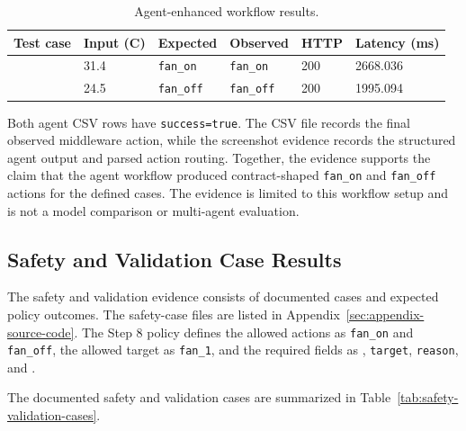 \begin{table}[H]
  \centering
  \small
  \caption{Agent-enhanced workflow results.}
  \label{tab:agent-results}
  \renewcommand{\arraystretch}{1.15}
  \begin{tabularx}{\textwidth}{@{}L{0.26\textwidth}L{0.10\textwidth}L{0.14\textwidth}L{0.14\textwidth}L{0.08\textwidth}Y@{}}
    \toprule
    Test case & Input (C) & Expected & Observed & HTTP & Latency (ms) \\
    \midrule
     & 31.4 & \texttt{fan\_on} & \texttt{fan\_on} & 200 & 2668.036 \\
     & 24.5 & \texttt{fan\_off} & \texttt{fan\_off} & 200 & 1995.094 \\
    \bottomrule
  \end{tabularx}
\end{table}

Both agent CSV rows have \texttt{success=true}. The CSV file records the final observed middleware action, while the screenshot evidence records the structured agent output and parsed action routing. Together, the evidence supports the claim that the agent workflow produced contract-shaped \texttt{fan\_on} and \texttt{fan\_off} actions for the defined cases. The evidence is limited to this workflow setup and is not a model comparison or multi-agent evaluation.

\subsection{Safety and Validation Case Results}\label{subsec:results-contract-safety}

The safety and validation evidence consists of documented cases and expected policy outcomes.  The safety-case files are listed in Appendix~\ref{sec:appendix-source-code}. The Step 8 policy defines the allowed actions as \texttt{fan\_on} and \texttt{fan\_off}, the allowed target as \texttt{fan\_1}, and the required fields as , \texttt{target}, \texttt{reason}, and .

The documented safety and validation cases are summarized in Table~\ref{tab:safety-validation-cases}.

